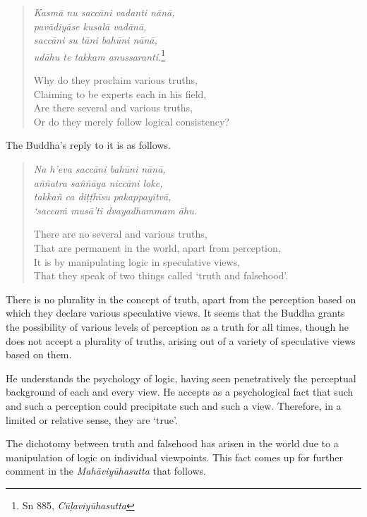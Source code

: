 \begin{quote}
\emph{Kasmā nu saccāni vadanti nānā,}\\
\emph{pavādiyāse kusalā vadānā,}\\
\emph{saccāni su tāni bahūni nānā,}\\
\emph{udāhu te takkam anussaranti.}\footnote{Sn 885, \emph{Cūḷaviyūhasutta}}

Why do they proclaim various truths,\\
Claiming to be experts each in his field,\\
Are there several and various truths,\\
Or do they merely follow logical consistency?
\end{quote}

The Buddha's reply to it is as follows.

\begin{quote}
\emph{Na h'eva saccāni bahūni nānā,}\\
\emph{aññatra saññāya niccāni loke,}\\
\emph{takkañ ca diṭṭhīsu pakappayitvā,}\\
\emph{`saccaṁ musā'ti dvayadhammam āhu.}

There are no several and various truths,\\
That are permanent in the world, apart from perception,\\
It is by manipulating logic in speculative views,\\
That they speak of two things called `truth and falsehood'.
\end{quote}

There is no plurality in the concept of truth, apart from the perception based on which they declare various speculative views. It seems that the Buddha grants the possibility of various levels of perception as a truth for all times, though he does not accept a plurality of truths, arising out of a variety of speculative views based on them.

He understands the psychology of logic, having seen penetratively the perceptual background of each and every view. He accepts as a psychological fact that such and such a perception could precipitate such and such a view. Therefore, in a limited or relative sense, they are `true'.

The dichotomy between truth and falsehood has arisen in the world due to a manipulation of logic on individual viewpoints. This fact comes up for further comment in the \emph{Mahāviyūhasutta} that follows.

